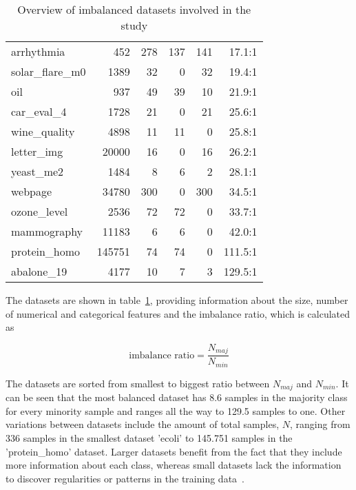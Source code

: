 \begin{table}
\begin{tabular}{lrrrrr}
             arrhythmia &     452 &       278 &                 137 &                   141 &          17.1:1 \\
         solar\_flare\_m0 &    1389 &        32 &                   0 &                    32 &          19.4:1 \\
                    oil &     937 &        49 &                  39 &                    10 &          21.9:1 \\
             car\_eval\_4 &    1728 &        21 &                   0 &                    21 &          25.6:1 \\
           wine\_quality &    4898 &        11 &                  11 &                     0 &          25.8:1 \\
             letter\_img &   20000 &        16 &                   0 &                    16 &          26.2:1 \\
              yeast\_me2 &    1484 &         8 &                   6 &                     2 &          28.1:1 \\
                webpage &   34780 &       300 &                   0 &                   300 &          34.5:1 \\
            ozone\_level &    2536 &        72 &                  72 &                     0 &          33.7:1 \\
            mammography &   11183 &         6 &                   6 &                     0 &          42.0:1 \\
           protein\_homo &  145751 &        74 &                  74 &                     0 &         111.5:1 \\
             abalone\_19 &    4177 &        10 &                   7 &                     3 &         129.5:1 \\
        \bottomrule
        \end{tabular}
    \caption{Overview of imbalanced datasets involved in the study}
    \label{tab:df_info}
\end{table}

The datasets are shown in table~\ref{tab:df_info}, providing information about the size, number of numerical and categorical features and the imbalance ratio, which is calculated as

\begin{equation}
    \text{imbalance ratio} = \frac{N_{maj}}{N_{min}}
\end{equation}

The datasets are sorted from smallest to biggest ratio between $N_{maj}$ and $N_{min}$. It can be seen that the most balanced dataset has 8.6 samples in the majority class for every minority sample and ranges all the way to 129.5 samples to one. Other variations between datasets include the amount of total samples, $N$, ranging from 336 samples in the smallest dataset 'ecoli' to 145.751 samples in the 'protein\_homo' dataset. Larger datasets benefit from the fact that they include more information about each class, whereas small datasets lack the information to discover regularities or patterns in the training data~\cite{Ali2013ClassificationReview}.

